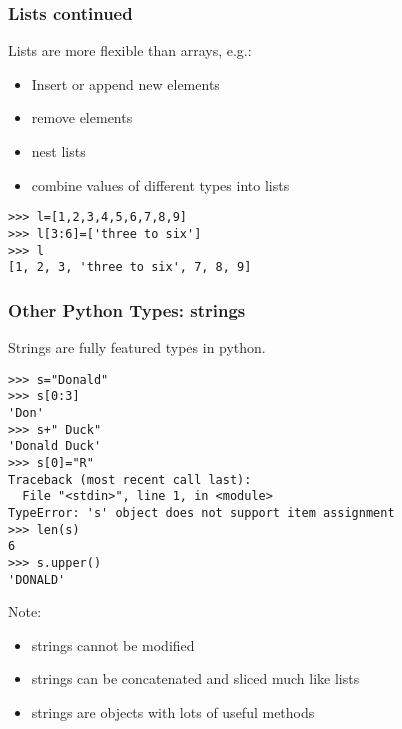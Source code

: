 \documentclass[10pt]{beamer}
\begin{document}
\begin{frame}[fragile]
\frametitle{Lists continued}

Lists are more flexible than arrays, e.g.:
\begin{itemize}
\item Insert or append new elements
\item remove elements
\item nest lists
\item combine values of different types into lists
\end{itemize}

\begin{verbatim}
>>> l=[1,2,3,4,5,6,7,8,9]
>>> l[3:6]=['three to six']
>>> l
[1, 2, 3, 'three to six', 7, 8, 9]
\end{verbatim}

\end{frame}

\begin{frame}[fragile]
\frametitle{Other Python Types: strings}

Strings are fully featured types in python.

\begin{verbatim}
>>> s="Donald"
>>> s[0:3]
'Don'
>>> s+" Duck"
'Donald Duck'
>>> s[0]="R"
Traceback (most recent call last):
  File "<stdin>", line 1, in <module>
TypeError: 's' object does not support item assignment
>>> len(s)
6
>>> s.upper()
'DONALD'
\end{verbatim}

Note:
\begin{itemize}
\item strings cannot be modified
\item strings can be concatenated and sliced much like lists
\item strings are objects with lots of useful methods
\end{itemize}

\end{frame}
\end{document}
